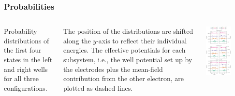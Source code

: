 \documentclass{beamer}
\begin{document}
\frame
    {
      \frametitle{Probabilities}
	
      \begin{footnotesize}
     \begin{columns}
       \column{5.0cm}
Probability distributions of the first four 
states in the left and right wells for all three configurations.

The position of the distributions are shifted along the $y$-axis
to reflect their individual energies. The effective potentials for each subsystem, i.e., the well potential set up by
the electrodes plus the mean-field contribution from the other
electron, are plotted as dashed lines.
\column{6cm}
      \begin{center}
	\includegraphics[width=0.6\textwidth]{qcfigures/probability.pdf}
      \end{center}
\end{columns}
      \end{footnotesize}
    }
\end{document}
